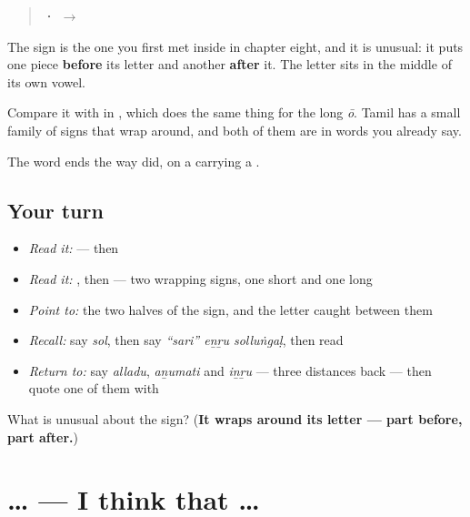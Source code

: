 \begin{quote}
\textbf{ ·  $\to$ }
\end{quote}

The \textbf{} sign is the one you first met inside \textbf{} in chapter eight, and it is unusual: it puts one piece \textbf{before} its letter and another \textbf{after} it. The letter sits in the middle of its own vowel.

Compare it with \textbf{} in \textbf{}, which does the same thing for the long \emph{ō}. Tamil has a small family of signs that wrap around, and both of them are in words you already say.

The word ends the way \textbf{} did, on a  carrying a \textbf{}.

\subsection*{Your turn}
\begin{itemize}
\raggedright
  \item \emph{Read it:} \textbf{} — then \textbf{}
  \item \emph{Read it:} \textbf{}, then \textbf{} — two wrapping signs, one short and one long
  \item \emph{Point to:} the two halves of the  sign, and the letter caught between them
  \item \emph{Recall:} say \emph{sol}, then say \emph{\textquotedblleft{}sari\textquotedblright{} eṉṟu solluṅgaḷ}, then read \textbf{}
  \item \emph{Return to:} say \emph{alladu}, \emph{aṉumati} and \emph{iṉṟu} — three distances back — then quote one of them with 
\end{itemize}

\begin{tcolorbox}[breakable,colback=teal!4,colframe=teal!35!black,title={Before you move on}]
What is unusual about the  sign? (\textbf{It wraps around its letter — part before, part after.})
\end{tcolorbox}
\section[\texorpdfstring{… \ta{என்று} \ta{நினைக்கிறேன்} (… eṉṟu niṉaikkiṟēṉ)}{… என்று நினைக்கிறேன் (… eṉṟu niṉaikkiṟēṉ)}]{…   — I think that …}


